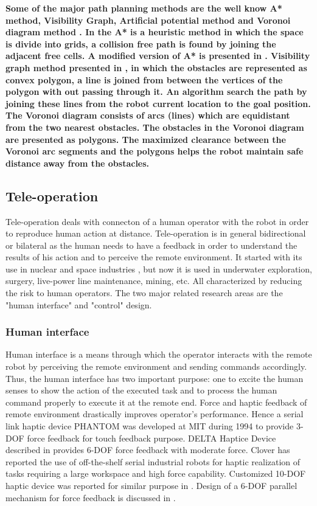 \textbf{Some of the major path planning methods are the well know \textbf{A*} method, Visibility Graph, Artificial potential method and  Voronoi diagram method \cite{garrido2006voronoi}. In the A* \cite{latombe2012robot} is a heuristic method in which the space is divide into grids, a collision  free path is found by joining the adjacent free cells. A modified version of A* is presented in \cite{duchovn2014path}.
Visibility graph method presented in \cite{nilsson1969mobile}, in which the obstacles are represented as convex polygon, a line is joined from between the vertices of the polygon with out passing through it. An algorithm search the path by joining these lines from the robot current location to the goal position.
The Voronoi diagram \cite{latombe2012robot, bhattacharya2008roadmap, takahashi1989motion} consists of arcs (lines) which are equidistant from the two nearest obstacles. The obstacles in the Voronoi diagram are presented as polygons.
The maximized clearance between the Voronoi arc segments and the polygons helps the robot maintain safe distance away from the obstacles.  }
\subsection{Tele-operation}
Tele-operation deals with  connecton of a   human operator with the robot in order to reproduce human action at distance. Tele-operation is in general bidirectional or bilateral as the human needs to have a feedback in order to understand the results of his action and to perceive the remote environment. It started with its use in nuclear and space industries \cite{martin1985teleoperated,vertut1986teleoperations}, but now it is used in underwater exploration, surgery, live-power line maintenance, mining, etc. All characterized by reducing the risk to human operators. The two major related research areas are the "human interface" and "control" design.
\subsubsection{Human interface}

Human interface is a means through which the operator interacts with the remote robot by perceiving the remote environment and sending commands accordingly. Thus, the human interface has two important purpose: one to excite the human senses to show the action of the executed task and to process the human command properly to execute it at the remote end.  Force and haptic feedback of remote environment drastically improves operator's performance. Hence a serial link haptic device PHANTOM \cite{massie1994phantom} was developed at MIT during 1994 to provide 3-DOF force feedback  for touch feedback purpose. DELTA Haptice Device described in \cite{grange2001overview} provides 6-DOF force feedback with moderate force. Clover \cite{clover1997dynamic} has reported  the use of off-the-shelf serial industrial robots for haptic realization of tasks requiring a large workspace and high force capability. Customized 10-DOF  haptic device was reported  for similar purpose in \cite{ueberle2004vishard10}. Design  of a 6-DOF parallel mechanism for force feedback is discussed in \cite{yoon2001design}.

